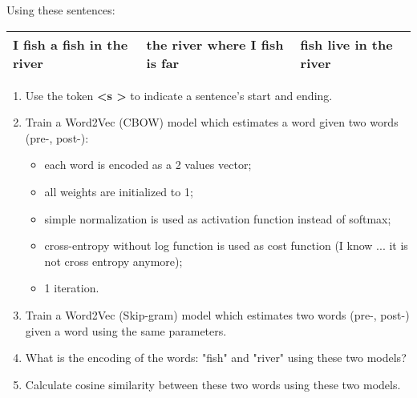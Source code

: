 \documentclass[11pt, a4paper]{article}
\begin{document}
\noindent Using these sentences:
\begin{center}
	\begin{tabular}{|lll|}
		\hline 
		I fish a fish in the river & the river where I fish is far & fish live in the river\\
		\hline
	\end{tabular}
\end{center}

\begin{enumerate}
	\item Use the token \textbf{\textless s \textgreater} to indicate a sentence's start and ending.
	\item Train a Word2Vec (CBOW) model which estimates a word given two words (pre-, post-):
	\begin{itemize}
		\item each word is encoded as a 2 values vector;
		\item all weights are initialized to 1;
		\item simple normalization is used as activation function instead of softmax;
		\item cross-entropy without log function is used as cost function (I know ... it is not cross entropy anymore);
		\item 1 iteration.
	\end{itemize}
	
	\item Train a Word2Vec (Skip-gram) model which estimates two words (pre-, post-) given a word using the same parameters.
	
	\item What is the encoding of the words: "fish" and "river" using these two models?
	\item Calculate cosine similarity between these two words using these two models. 
	

\end{enumerate}
\end{document}
